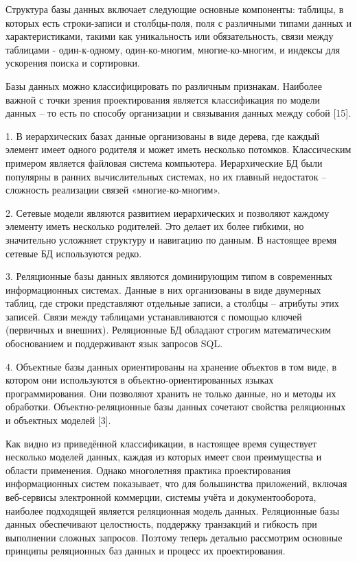 \documentclass[14pt,a4paper]{extarticle}
\begin{document}
Структура базы данных включает следующие основные компоненты: таблицы, в
которых есть строки-записи и столбцы-поля, поля с различными типами
данных и характеристиками, такими как уникальность или обязательность,
связи между таблицами - один-к-одному, один-ко-многим, многие-ко-многим,
и индексы для ускорения поиска и сортировки.

Базы данных можно классифицировать по различным признакам. Наиболее
важной с точки зрения проектирования является классификация по модели
данных -- то есть по способу организации и связывания данных между собой
[15].

1. В иерархических базах данные организованы в виде дерева, где каждый
элемент имеет одного родителя и может иметь несколько потомков.
Классическим примером является файловая система компьютера.
Иерархические БД были популярны в ранних вычислительных системах, но их
главный недостаток -- сложность реализации связей «многие-ко-многим».

2. Сетевые модели являются развитием иерархических и позволяют каждому
элементу иметь несколько родителей. Это делает их более гибкими, но
значительно усложняет структуру и навигацию по данным. В настоящее время
сетевые БД используются редко.

3. Реляционные базы данных являются доминирующим типом в современных
информационных системах. Данные в них организованы в виде двумерных
таблиц, где строки представляют отдельные записи, а столбцы -- атрибуты
этих записей. Связи между таблицами устанавливаются с помощью ключей
(первичных и внешних). Реляционные БД обладают строгим математическим
обоснованием и поддерживают язык запросов SQL.

4. Объектные базы данных ориентированы на хранение объектов в том виде,
в котором они используются в объектно-ориентированных языках
программирования. Они позволяют хранить не только данные, но и методы их
обработки. Объектно-реляционные базы данных сочетают свойства
реляционных и объектных моделей [3].

Как видно из приведённой классификации, в настоящее время существует
несколько моделей данных, каждая из которых имеет свои преимущества и
области применения. Однако многолетняя практика проектирования
информационных систем показывает, что для большинства приложений,
включая веб-сервисы электронной коммерции, системы учёта и
документооборота, наиболее подходящей является реляционная модель
данных. Реляционные базы данных обеспечивают целостность, поддержку
транзакций и гибкость при выполнении сложных запросов. Поэтому теперь
детально рассмотрим основные принципы реляционных баз данных и процесс
их проектирования.
\end{document}
